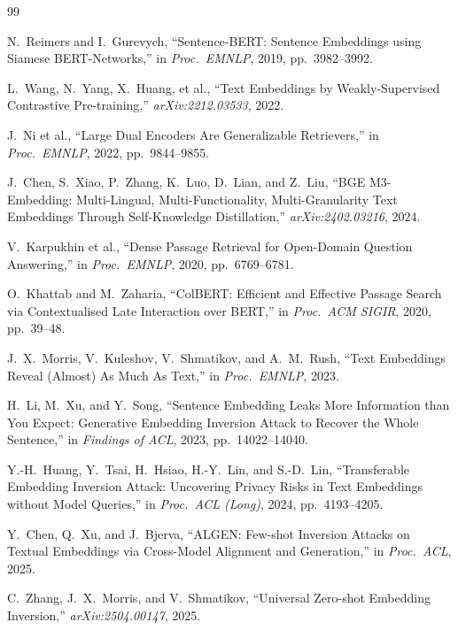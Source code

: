 \begin{thebibliography}{99}\small

 N.\ Reimers and I.\ Gurevych, ``Sentence-BERT:
Sentence Embeddings using Siamese BERT-Networks,'' in
\emph{Proc.\ EMNLP}, 2019, pp.\ 3982--3992.

 L.\ Wang, N.\ Yang, X.\ Huang, et al.,
``Text Embeddings by Weakly-Supervised Contrastive Pre-training,''
\emph{arXiv:2212.03533}, 2022.

 J.\ Ni et al., ``Large Dual Encoders Are Generalizable
Retrievers,'' in \emph{Proc.\ EMNLP}, 2022, pp.\ 9844--9855.

 J.\ Chen, S.\ Xiao, P.\ Zhang, K.\ Luo, D.\ Lian,
and Z.\ Liu, ``BGE M3-Embedding: Multi-Lingual, Multi-Functionality,
Multi-Granularity Text Embeddings Through Self-Knowledge Distillation,''
\emph{arXiv:2402.03216}, 2024.

 V.\ Karpukhin et al., ``Dense Passage Retrieval for
Open-Domain Question Answering,'' in \emph{Proc.\ EMNLP}, 2020,
pp.\ 6769--6781.

 O.\ Khattab and M.\ Zaharia, ``ColBERT: Efficient
and Effective Passage Search via Contextualised Late Interaction over
BERT,'' in \emph{Proc.\ ACM SIGIR}, 2020, pp.\ 39--48.

 J.\ X.\ Morris, V.\ Kuleshov, V.\ Shmatikov, and
A.\ M.\ Rush, ``Text Embeddings Reveal (Almost) As Much As Text,'' in
\emph{Proc.\ EMNLP}, 2023.

 H.\ Li, M.\ Xu, and Y.\ Song, ``Sentence Embedding
Leaks More Information than You Expect: Generative Embedding Inversion
Attack to Recover the Whole Sentence,'' in \emph{Findings of ACL}, 2023,
pp.\ 14022--14040.

 Y.-H.\ Huang, Y.\ Tsai, H.\ Hsiao, H.-Y.\ Lin, and
S.-D.\ Lin, ``Transferable Embedding Inversion Attack: Uncovering Privacy
Risks in Text Embeddings without Model Queries,'' in \emph{Proc.\ ACL
(Long)}, 2024, pp.\ 4193--4205.

 Y.\ Chen, Q.\ Xu, and J.\ Bjerva, ``ALGEN:
Few-shot Inversion Attacks on Textual Embeddings via Cross-Model
Alignment and Generation,'' in \emph{Proc.\ ACL}, 2025.

 C.\ Zhang, J.\ X.\ Morris, and V.\ Shmatikov,
``Universal Zero-shot Embedding Inversion,'' \emph{arXiv:2504.00147},
2025.


\end{thebibliography}
